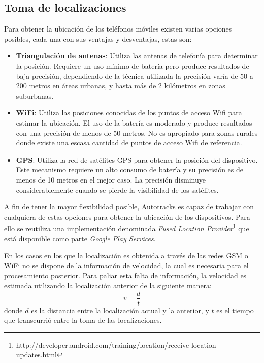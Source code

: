 \subsection{Toma de localizaciones}
\label{toma_localizaciones}

Para obtener la ubicación de los teléfonos móviles existen varias opciones posibles, cada una con sus ventajas y desventajas, estas son: 
\begin{itemize}
\item \textbf{Triangulación de antenas}: Utiliza las antenas de telefonía para determinar la posición. Requiere un uso mínimo de batería pero produce resultados de baja precisión, dependiendo de la técnica utilizada la precisión varía de 50 a 200 metros en áreas urbanas, y hasta más de 2 kilómetros en zonas suburbanas.
\item \textbf{WiFi}: Utiliza las posiciones conocidas de los puntos de acceso Wifi para estimar la ubicación. El uso de la batería es moderado y produce resultados con una precisión de menos de 50 metros. No es apropiado para zonas rurales donde existe una escasa cantidad de puntos de acceso Wifi de referencia.
\item \textbf{GPS}: Utiliza la red de satélites GPS para obtener la posición del dispositivo. Este mecanismo requiere un alto consumo de batería y su precisión es de menos de 10 metros en el mejor caso. La precisión disminuye considerablemente cuando se pierde la visibilidad de los satélites.
\end{itemize}
A fin de tener la mayor flexibilidad posible, Autotracks es capaz de trabajar con cualquiera de estas opciones para obtener la ubicación de los dispositivos. Para ello se reutiliza una implementación denominada \emph{Fused Location Provider}\footnote{http://developer.android.com/training/location/receive-location-updates.html} que está disponible como parte \emph{Google Play Services}.

En los casos en los que la localización es obtenida a través de las redes GSM o WiFi no se dispone de la información de velocidad, la cual es necesaria para el procesamiento posterior. Para paliar esta falta de información, la velocidad es estimada utilizando la localización anterior de la siguiente manera: \begin{equation} \label{eq:velocidad} v=\frac { d }{ t } \end{equation} donde $d$ es la distancia entre la localización actual y la anterior, y $t$ es el tiempo que transcurrió entre la toma de las localizaciones.


